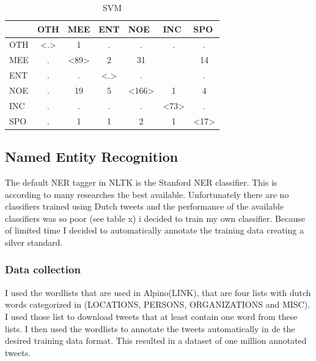\documentclass[
10pt, %
a4paper, %
oneside, %
headinclude,footinclude, %
BCOR5mm, %
]{scrartcl}
\begin{document}
\begin{table}[h]
\caption[Table caption text]{SVM }
\begin{tabular}{|l|c|c|c|c|c|c|}
\hline
    & \multicolumn{1}{l|}{OTH} & \multicolumn{1}{l|}{MEE} & \multicolumn{1}{l|}{ENT} & \multicolumn{1}{l|}{NOE} & \multicolumn{1}{l|}{INC} & \multicolumn{1}{l|}{SPO} \\ \hline
OTH & \textless.\textgreater   & 1                        & .                        & .                        & .                        & .                        \\ \hline
MEE & .                        & \textless89\textgreater  & 2                        & 31                       &                          & 14                       \\ \hline
ENT & .                        & .                        & \textless.\textgreater   & .                        &                          & .                        \\ \hline
NOE & .                        & 19                       & 5                        & \textless166\textgreater & 1                        & 4                        \\ \hline
INC & .                        & .                        & .                        & .                        & \textless73\textgreater  & .                        \\ \hline
SPO & .                        & 1                        & 1                        & 2                        & 1                        & \textless17\textgreater  \\ \hline
\end{tabular}

\end{table}

\subsection{Named Entity Recognition}
The default NER tagger in NLTK is the Stanford NER classifier. This is according to many researches the best available. Unfortunately there are no classifiers trained using Dutch tweets and the performance of the available classifiers was so poor (see table x) i decided to train my own classifier. Because of limited time I decided to automatically annotate the training data creating a silver standard.

\subsubsection{Data collection}
I used the wordlists that are used in Alpino(LINK), that are four lists with dutch words categorized in (LOCATIONS, PERSONS, ORGANIZATIONS and MISC). I used those list to download tweets that at least contain one word from these lists. I then used the wordlists to annotate the tweets automatically in de the desired training data format. This resulted in a dataset of one million annotated tweets. 
\end{document}
